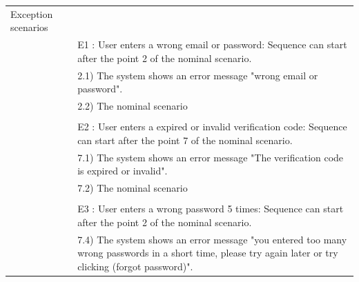\documentclass[]{uc2pfecaneva}
\begin{document}
\begin{table}[h]
\begin{tabularx}{\textwidth}{|l|X|}
		Exception scenarios   &                                                                                                                                                                      \\
		                      & E1 : User enters a wrong email or password: Sequence can start after the point 2 of the nominal scenario.                                                            \\
		                      & \hspace{4mm}2.1) The system shows an error message "wrong email or password".                                                                                        \\
		                      & \hspace{4mm}2.2) The nominal scenario                                                                                                                                \\
		                      &                                                                                                                                                                      \\
		                      & E2 : User enters a expired or invalid verification code: Sequence can start after the point 7 of the nominal scenario.                                               \\
		                      & \hspace{4mm}7.1) The system shows an error message "The verification code is expired or invalid".                                                                    \\
		                      & \hspace{4mm}7.2) The nominal scenario                                                                                                                                \\
		                      &                                                                                                                                                                      \\
		                      & E3 : User enters a wrong password 5 times: Sequence can start after the point 2 of the nominal scenario.                                                             \\
		                      & \hspace{4mm}7.4) The system shows an error message "you entered too many wrong passwords in a short time, please try again later or try clicking (forgot password)". \\

\end{tabularx}
\end{table}
\end{document}
